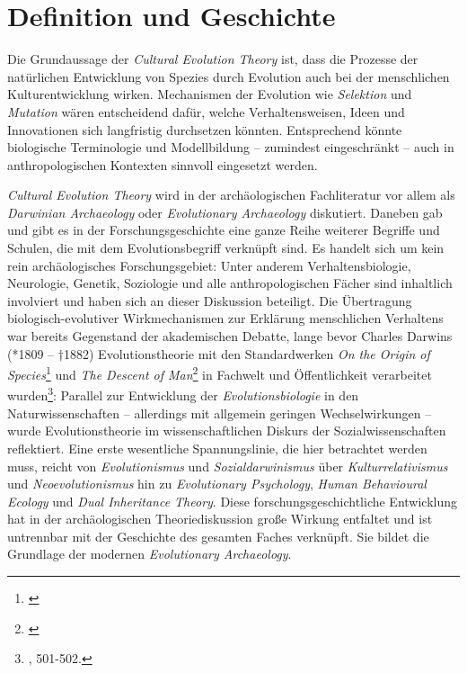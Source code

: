 \documentclass[openany,twoside,twocolumn]{book}
\let\rmarkdownfootnote\footnote%
\def\footnote{\protect\rmarkdownfootnote}
\begin{document}
\hypertarget{definition-und-geschichte}{%
\section{Definition und Geschichte}\label{definition-und-geschichte}}

Die Grundaussage der \emph{Cultural Evolution Theory} ist, dass die
Prozesse der natürlichen Entwicklung von Spezies durch Evolution auch
bei der menschlichen Kulturentwicklung wirken. Mechanismen der Evolution
wie \emph{Selektion} und \emph{Mutation} wären entscheidend dafür,
welche Verhaltensweisen, Ideen und Innovationen sich langfristig
durchsetzen könnten. Entsprechend könnte biologische Terminologie und
Modellbildung -- zumindest eingeschränkt -- auch in anthropologischen
Kontexten sinnvoll eingesetzt werden.

\emph{Cultural Evolution Theory} wird in der archäologischen
Fachliteratur vor allem als \emph{Darwinian Archaeology} oder
\emph{Evolutionary Archaeology} diskutiert. Daneben gab und gibt es in
der Forschungsgeschichte eine ganze Reihe weiterer Begriffe und Schulen,
die mit dem Evolutionsbegriff verknüpft sind. Es handelt sich um kein
rein archäologisches Forschungsgebiet: Unter anderem Verhaltensbiologie,
Neurologie, Genetik, Soziologie und alle anthropologischen Fächer sind
inhaltlich involviert und haben sich an dieser Diskussion beteiligt. Die
Übertragung biologisch-evolutiver Wirkmechanismen zur Erklärung
menschlichen Verhaltens war bereits Gegenstand der akademischen Debatte,
lange bevor Charles Darwins (*1809 -- †1882) Evolutionstheorie mit den
Standardwerken \emph{On the Origin of Species}\footnote{\textcite{Darwinoriginspeciesmeans1859}}
und \emph{The Descent of Man}\footnote{\textcite{Darwindescentmanselection1871}}
in Fachwelt und Öffentlichkeit verarbeitet wurden\footnote{\textcite{petermann_geschichte_2004},
  501-502.}: Parallel zur Entwicklung der \emph{Evolutionsbiologie} in
den Naturwissenschaften -- allerdings mit allgemein geringen
Wechselwirkungen -- wurde Evolutionstheorie im wissenschaftlichen
Diskurs der Sozialwissenschaften reflektiert. Eine erste wesentliche
Spannungslinie, die hier betrachtet werden muss, reicht von
\emph{Evolutionismus} und \emph{Sozialdarwinismus} über
\emph{Kulturrelativismus} und \emph{Neoevolutionismus} hin zu
\emph{Evolutionary Psychology}, \emph{Human Behavioural Ecology} und
\emph{Dual Inheritance Theory}. Diese forschungsgeschichtliche
Entwicklung hat in der archäologischen Theoriediskussion große Wirkung
entfaltet und ist untrennbar mit der Geschichte des gesamten Faches
verknüpft. Sie bildet die Grundlage der modernen \emph{Evolutionary
Archaeology}.
\end{document}
